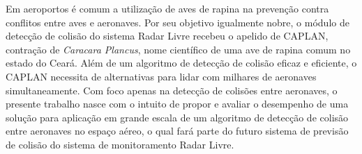 

Em aeroportos é comum a utilização de aves de rapina na prevenção contra conflitos entre aves e aeronaves. Por seu objetivo igualmente nobre, o módulo de detecção de colisão do sistema Radar Livre recebeu o apelido de CAPLAN, contração de \textit{Caracara Plancus}, nome científico de uma ave de rapina comum no estado do Ceará. Além de um algoritmo de detecção de colisão eficaz e eficiente, o CAPLAN necessita de alternativas para lidar com milhares de aeronaves simultaneamente. Com foco apenas na detecção de colisões entre aeronaves, o presente trabalho nasce com o intuito de propor e avaliar o desempenho de uma solução para aplicação em grande escala de um algoritmo de detecção de colisão entre aeronaves no espaço aéreo, o qual fará parte do futuro sistema de previsão de colisão do sistema de monitoramento Radar Livre.
